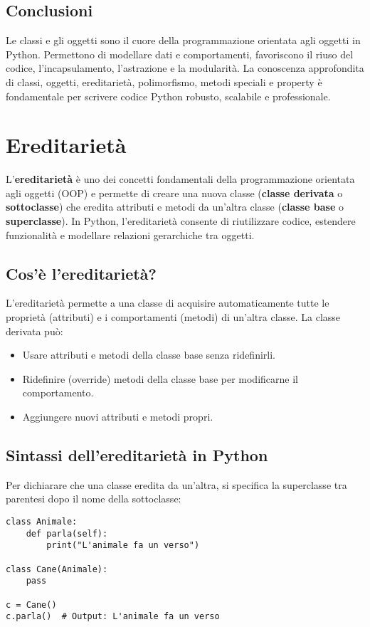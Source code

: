 \documentclass[a4paper,12pt]{article}
\begin{document}
\subsection*{Conclusioni}
Le classi e gli oggetti sono il cuore della programmazione orientata agli oggetti in Python. Permettono di modellare dati e comportamenti, favoriscono il riuso del codice, l'incapsulamento, l'astrazione e la modularità. La conoscenza approfondita di classi, oggetti, ereditarietà, polimorfismo, metodi speciali e property è fondamentale per scrivere codice Python robusto, scalabile e professionale.

\section{Ereditarietà}
L'\textbf{ereditarietà} è uno dei concetti fondamentali della programmazione orientata agli oggetti (OOP) e permette di creare una nuova classe (\textbf{classe derivata} o \textbf{sottoclasse}) che eredita attributi e metodi da un'altra classe (\textbf{classe base} o \textbf{superclasse}). In Python, l'ereditarietà consente di riutilizzare codice, estendere funzionalità e modellare relazioni gerarchiche tra oggetti.

\subsection*{Cos'è l'ereditarietà?}
L'ereditarietà permette a una classe di acquisire automaticamente tutte le proprietà (attributi) e i comportamenti (metodi) di un'altra classe. La classe derivata può:
\begin{itemize}
    \item Usare attributi e metodi della classe base senza ridefinirli.
    \item Ridefinire (override) metodi della classe base per modificarne il comportamento.
    \item Aggiungere nuovi attributi e metodi propri.
\end{itemize}

\subsection*{Sintassi dell'ereditarietà in Python}
Per dichiarare che una classe eredita da un'altra, si specifica la superclasse tra parentesi dopo il nome della sottoclasse:
\begin{lstlisting}
class Animale:
    def parla(self):
        print("L'animale fa un verso")

class Cane(Animale):
    pass

c = Cane()
c.parla()  # Output: L'animale fa un verso
\end{lstlisting}
\end{document}
